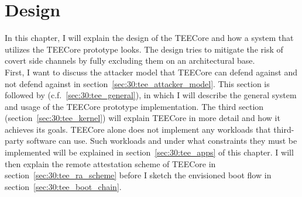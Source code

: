 \chapter{Design}
\label{sec:design}



In this chapter, I will explain the design of the TEECore and how a system that
utilizes the TEECore prototype looks. The design tries to mitigate the risk of
covert side channels by fully excluding them on an architectural base.\\

First, I want to discuss the attacker model that TEECore can defend against and
not defend against in section~\ref{sec:30:tee_attacker_model}. This section is
followed by (c.f.~\ref{sec:30:tee_general}), in which I will describe the
general system and usage of the TEECore prototype implementation. The third
section (section~\ref{sec:30:tee_kernel}) will explain TEECore in more detail
and how it achieves its goals. TEECore alone does not implement any workloads
that third-party software can use. Such workloads and under what constraints
they must be implemented will be explained in section~\ref{sec:30:tee_apps} of
this chapter. I will then explain the remote attestation scheme of TEECore in
section~\ref{sec:30:tee_ra_scheme} before I sketch the envisioned boot flow in
section~\ref{sec:30:tee_boot_chain}.

